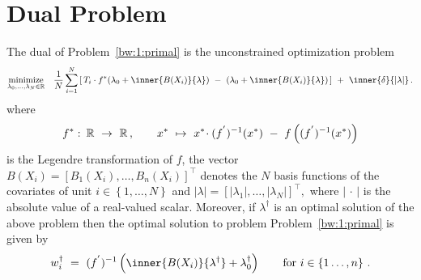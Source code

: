\section*{Dual Problem}
\begin{ftheorem}
  \label{dual_solution_th}
  The dual of 
  Problem~\ref{bw:1:primal}
  is the unconstrained optimization problem 
\begin{gather*}
  \underset
  {\lambda_0,\ldots,\lambda_{N}\in \R}
  {
    \mathrm{minimize}
  }
  \quad
  \frac{1}{N}
\sum_{i=1} 
  ^N
  \left[ 
    \,
  T_i
  \cdot
  f^*
  \!
  \left( 
\lambda_0
+
\inner
{B(X_i)}
{\lambda}
  \right)
  \ 
-
\ 
  \left( 
\lambda_0
+
\inner
{B(X_i)}
{\lambda}
  \right)
  \,
  \right]
  \ 
+
\ 
\inner
{\delta}
{|\lambda|}
  \,.
\end{gather*}
  where
  \begin{gather*}
  f^*
  \,
  \colon
  \, 
  \R
  \ 
  \to
  \ 
  \R
  \,
  ,
  \qquad 
  x^*
  \ 
  \mapsto
  \ 
    x^*
    \!
    \cdot
    (f^{'})^{-1}(x^*)
  \ 
    -
  \ 
    f
    \left( 
      (f^{'})^{-1}(x^*)
    \right)
  \end{gather*}
  is the Legendre transformation of $f$,
  the vector
  $
    B(X_i)
    =
    \left[ 
      B_1(X_i)
      ,
      \ldots
      ,
      B_n(X_i)
    \right]
    ^\top
  $
  denotes 
  the $N$ basis functions of the covariates 
  of unit $i\in \left\{ 1, \ldots, N \right\}$
  and
  $
    \left| \lambda \right|
    =
    \left[ 
      \left| \lambda_1 \right|
      ,
      \ldots
      ,
      \left| \lambda_N \right|
    \right]
    ^\top
    ,
  $
  where $\left| \,\cdot\, \right|$
  is the absolute value of a real-valued scalar.
  Moreover,
  if $\lambda^\dagger$
  is an optimal solution of the above problem 
  then the optimal solution to problem
  Problem~\ref{bw:1:primal}
  is given by
  \begin{gather*}
    w_i^\dagger
    \ 
    =
    \ 
    (f^{'})^{-1}
    \left( 
      \inner
      {B(X_i)}
      {\lambda^\dagger}
      +
      \lambda_0^\dagger
    \right)
    \qquad
    \text{for}\ 
    i\in \left\{ 1\ldots,n \right\}
    \,.
  \end{gather*}
\end{ftheorem}
